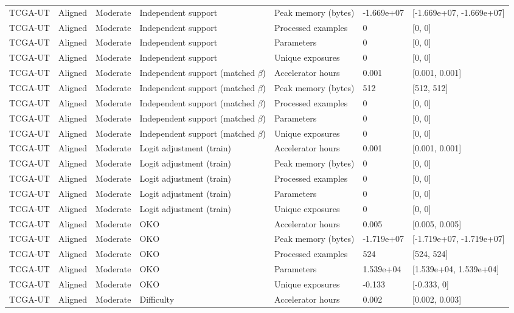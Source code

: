 \begin{longtable}{lllllll}
TCGA-UT & Aligned & Moderate & Independent support & Peak memory (bytes) & -1.669e+07 & [-1.669e+07, -1.669e+07] \\
TCGA-UT & Aligned & Moderate & Independent support & Processed examples & 0 & [0, 0] \\
TCGA-UT & Aligned & Moderate & Independent support & Parameters & 0 & [0, 0] \\
TCGA-UT & Aligned & Moderate & Independent support & Unique exposures & 0 & [0, 0] \\
TCGA-UT & Aligned & Moderate & Independent support (matched $\beta$) & Accelerator hours & 0.001 & [0.001, 0.001] \\
TCGA-UT & Aligned & Moderate & Independent support (matched $\beta$) & Peak memory (bytes) & 512 & [512, 512] \\
TCGA-UT & Aligned & Moderate & Independent support (matched $\beta$) & Processed examples & 0 & [0, 0] \\
TCGA-UT & Aligned & Moderate & Independent support (matched $\beta$) & Parameters & 0 & [0, 0] \\
TCGA-UT & Aligned & Moderate & Independent support (matched $\beta$) & Unique exposures & 0 & [0, 0] \\
TCGA-UT & Aligned & Moderate & Logit adjustment (train) & Accelerator hours & 0.001 & [0.001, 0.001] \\
TCGA-UT & Aligned & Moderate & Logit adjustment (train) & Peak memory (bytes) & 0 & [0, 0] \\
TCGA-UT & Aligned & Moderate & Logit adjustment (train) & Processed examples & 0 & [0, 0] \\
TCGA-UT & Aligned & Moderate & Logit adjustment (train) & Parameters & 0 & [0, 0] \\
TCGA-UT & Aligned & Moderate & Logit adjustment (train) & Unique exposures & 0 & [0, 0] \\
TCGA-UT & Aligned & Moderate & OKO & Accelerator hours & 0.005 & [0.005, 0.005] \\
TCGA-UT & Aligned & Moderate & OKO & Peak memory (bytes) & -1.719e+07 & [-1.719e+07, -1.719e+07] \\
TCGA-UT & Aligned & Moderate & OKO & Processed examples & 524 & [524, 524] \\
TCGA-UT & Aligned & Moderate & OKO & Parameters & 1.539e+04 & [1.539e+04, 1.539e+04] \\
TCGA-UT & Aligned & Moderate & OKO & Unique exposures & -0.133 & [-0.333, 0] \\
TCGA-UT & Aligned & Moderate & Difficulty & Accelerator hours & 0.002 & [0.002, 0.003] \\

\end{longtable}
